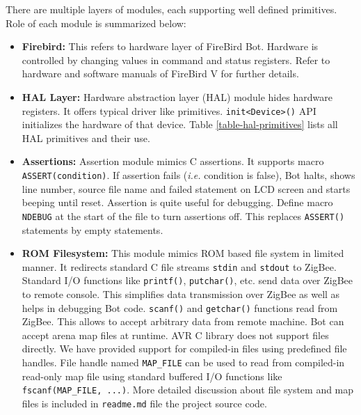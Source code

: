 \documentclass[a4paper, 12pt]{article}
\begin{document}
There are multiple layers of modules, each supporting well defined primitives. Role of each module is 
summarized below:
\begin{itemize}
 \item \textbf{Firebird:} This refers to hardware layer of FireBird Bot. Hardware is controlled by changing
  values in command and status registers. Refer to hardware \cite{fbhwmanual} and software \cite{fbswmanual} 
  manuals of FireBird V for further details.
  
  \item \textbf{HAL Layer:} Hardware abstraction layer (HAL) module hides hardware registers. It offers
  typical driver like primitives. \texttt{init<Device>()} API initializes the hardware of that device. Table \ref{table-hal-primitives} lists all HAL primitives and their use.
  
  \item \textbf{Assertions:} Assertion module mimics C assertions. It supports macro 
  \texttt{ASSERT(condition)}. If assertion fails (\emph{i.e.} condition is false), Bot halts, shows
  line number, source file name and failed statement on LCD screen and starts beeping until reset. Assertion
  is quite useful for debugging. Define macro \texttt{NDEBUG} at the start of the file to turn assertions off. This replaces \texttt{ASSERT()}
  statements by empty statements.
  
  \item \textbf{ROM Filesystem:} This module mimics ROM based file system in limited manner. It redirects standard
  C file streams \texttt{stdin} and \texttt{stdout} to ZigBee. Standard I/O functions  like \texttt{printf()}, \texttt{putchar()}, etc.
  send data over ZigBee to remote console. This simplifies data transmission over ZigBee
  as well as helps in debugging Bot code.  
  \texttt{scanf()} and \texttt{getchar()} functions read from ZigBee. This allows to accept arbitrary data from
  remote machine. Bot can accept arena map files at runtime.
  AVR C library does not support files directly. We have provided support for compiled-in files using predefined
  file handles. File handle named \texttt{MAP\_FILE} can be used to read from compiled-in read-only map file using
  standard buffered I/O functions like \texttt{fscanf(MAP\_FILE, ...)}. More detailed discussion about file system
  and map files is included in \texttt{readme.md} file the project source code.
  

\end{itemize}
\end{document}
